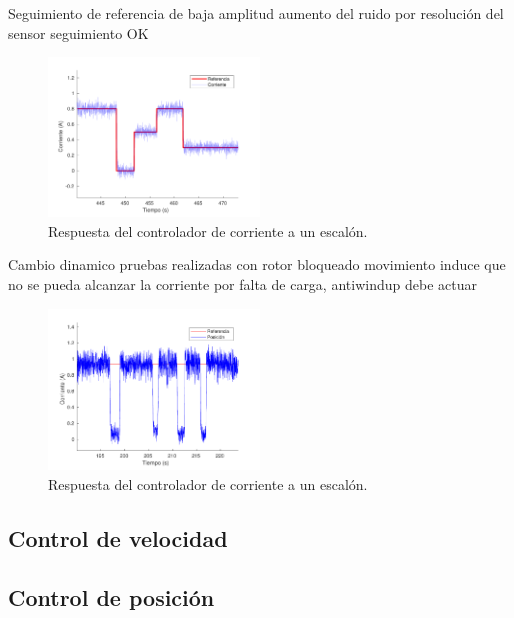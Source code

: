 Seguimiento de referencia de baja amplitud
aumento del ruido por resolución del sensor
seguimiento OK

\begin{figure}[H]
  \centering
  \includegraphics[width=0.5\textwidth]{img/cap5/corriente_cambio_referencia_bajo.pdf}
  \caption{Respuesta del controlador de corriente a un escalón.}
  \label{cap5_corriente_cambio_referencia_bajo}
\end{figure}




Cambio dinamico
pruebas realizadas con rotor bloqueado
movimiento induce que no se pueda alcanzar la corriente por falta de carga, antiwindup debe actuar

\begin{figure}[H]
  \centering
  \includegraphics[width=0.5\textwidth]{img/cap5/cambio_dinamico_corriente.pdf}
  \caption{Respuesta del controlador de corriente a un escalón.}
  \label{cap5_cambio_dinamico_corriente}
\end{figure}


\subsection{Control de velocidad}

\subsection{Control de posición}


